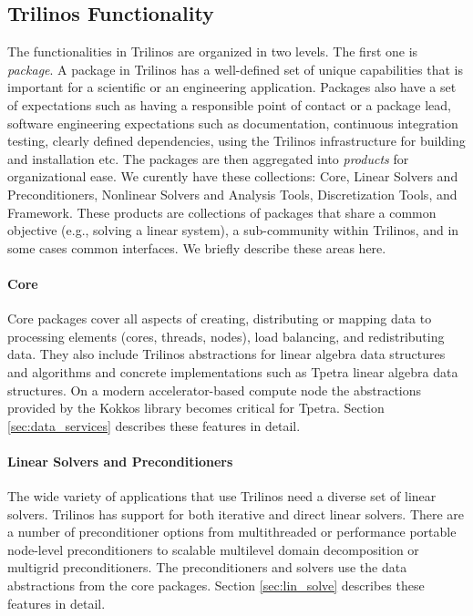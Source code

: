 \subsection{Trilinos Functionality}

The functionalities in Trilinos are organized in two levels. The first one is \textit{package}. A package in Trilinos has a well-defined set of unique capabilities that is important for a scientific or an engineering application. Packages also have a set of expectations such as having a responsible point of contact or a package lead, software engineering expectations such as documentation, continuous integration testing, clearly defined dependencies, using the Trilinos infrastructure for building and installation etc. The packages are then aggregated into \emph{products} for organizational ease. We curently have these collections: Core, Linear Solvers and Preconditioners, Nonlinear Solvers and Analysis Tools, Discretization Tools, and Framework. These products are collections of packages that share a common objective (e.g., solving a linear system), a sub-community within Trilinos, and in some cases common interfaces. We briefly describe these areas here.

\paragraph{Core} Core packages cover all aspects of creating, distributing or mapping data to processing elements (cores, threads, nodes), load balancing, and redistributing data. They also include Trilinos abstractions for linear algebra data structures and algorithms and concrete implementations such as Tpetra linear algebra data structures. On a modern accelerator-based compute node the abstractions provided by the Kokkos library becomes critical for Tpetra. Section \ref{sec:data_services} describes these features in detail.
 
\paragraph{Linear Solvers and Preconditioners} The wide variety of applications that use Trilinos need a diverse set of linear solvers. Trilinos has support for both iterative and direct linear solvers. There are a number of preconditioner options from multithreaded or performance portable node-level preconditioners to scalable multilevel domain decomposition or multigrid preconditioners. The preconditioners and solvers use the data abstractions from the core packages. Section \ref{sec:lin_solve} describes these features in detail.


